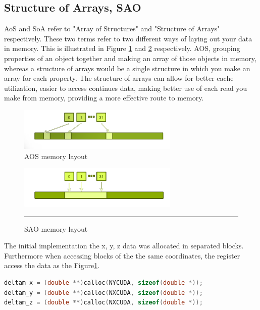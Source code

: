 \subsection{Structure of Arrays, SAO}

AoS and SoA refer to "Array of Structures" and "Structure of Arrays" respectively. These two terms refer to two different ways of laying out your data in memory. This is illustrated in Figure \ref{fig:aos} and \ref{fig:sao} respectively. AOS, grouping properties of an object together and making an array of those objects in memory, whereas a structure of arrays would be a single structure in which you make an array for each property. The structure of arrays can allow for better cache utilization, easier to access continues data, making better use of each read you make from memory, providing a more effective route to memory. 

\begin{figure}[htbp]
	\centering
		\includegraphics[width=0.68\textwidth]{Figures/aos.png}
		\smallskip
	\caption[Array of structures (AOS)]{AOS memory layout }
	\label{fig:aos}
\end{figure}


\begin{figure}[htbp]
	\centering
		\includegraphics[width=0.68\textwidth]{Figures/soa.png}
		\rule{35em}{0.2pt}
	\caption[Structure of Arrays (SAO)]{SAO memory layout}
	\label{fig:sao}
\end{figure}

The initial implementation the  x, y, z data was allocated in separated blocks. Furthermore when accessing blocks of the the same coordinates, the register access the data as the Figure\ref{fig:aos}.

\begin{lstlisting}[language=C++, caption={AOS implementation}]
deltam_x = (double **)calloc(NYCUDA, sizeof(double *));
deltam_y = (double **)calloc(NXCUDA, sizeof(double *));
deltam_z = (double **)calloc(NXCUDA, sizeof(double *));
\end{lstlisting}

